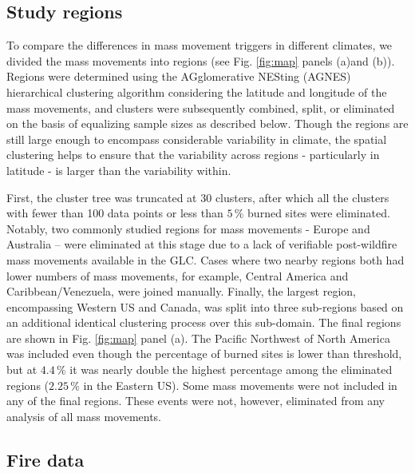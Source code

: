 \documentclass[nhess, manuscript]{copernicus}
\begin{document}
\subsection{Study regions}\label{sec:study-regions}

To compare the differences in mass movement triggers in different climates,
we divided the mass movements into regions (see Fig. \ref{fig:map}
panels (a)and (b)). Regions were determined using the AGglomerative NESting
(AGNES) hierarchical clustering algorithm \citep{kaufman2009finding}
considering the latitude and longitude of the mass movements, and clusters were subsequently
combined, split, or eliminated on the basis of equalizing sample sizes as described below. 
Though the regions are still large enough to encompass considerable variability in 
climate, the spatial clustering helps to ensure that the variability across 
regions - particularly in latitude - is larger than the variability within.

First, the cluster tree was
truncated at 30 clusters, after which all the clusters with fewer than
100 data points or less than \(5\,\%\) burned sites were eliminated. Notably, two commonly studied regions for mass movements - Europe and Australia \citep[e.g. ][]{vandeneeckhautStateArtNational2012,nymanEvidenceDebrisFlow2011} – were eliminated at this stage due to a lack of verifiable post-wildfire mass movements available in the GLC. Cases where
two nearby regions both had lower numbers of mass movements, for example, Central America and
Caribbean/Venezuela, were joined manually. Finally, the largest region, encompassing 
Western US and Canada, was split into three sub-regions based on an additional identical clustering 
process over this sub-domain. The final regions are shown in
Fig. \ref{fig:map} panel (a). The Pacific Northwest of North America was included
even though the percentage of burned sites is lower than threshold,
but at \(4.4\,\%\) it was nearly double the highest percentage
among the eliminated regions (\(2.25\,\%\) in the Eastern US). Some mass movements
were not included in any of the final regions. These events were not, however,
eliminated from any analysis of all mass movements.

\subsection{Fire data}\label{sec:fire-data}
\end{document}
